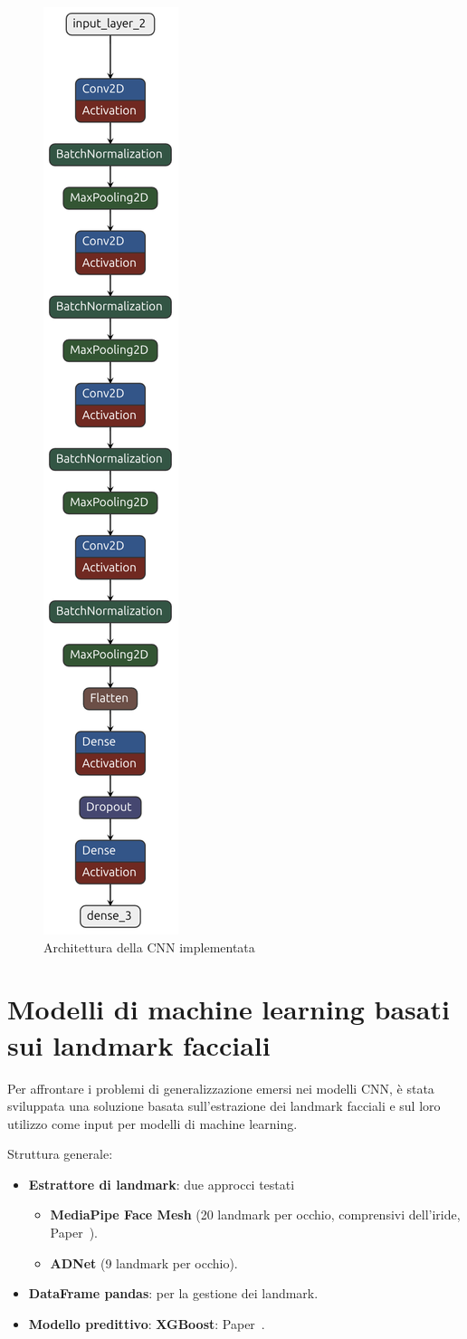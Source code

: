 \documentclass[12pt,a4paper,openright,twoside]{book}
\begin{document}
\begin{figure}
    \centering
    \includegraphics[width=.2\linewidth]{figures/custom-CNN-architecture}
    \caption{Architettura della CNN implementata}
    \label{fig:custom_CNN_architecture}
\end{figure}

\section{Modelli di machine learning basati sui landmark facciali}
\label{chap:landmark_based_model}

Per affrontare i problemi di generalizzazione emersi nei modelli CNN, è stata sviluppata una soluzione basata sull'estrazione dei landmark facciali e sul loro utilizzo come input per modelli di machine learning.  

Struttura generale:
\begin{itemize}
    \item \textbf{Estrattore di landmark}: due approcci testati
    \begin{itemize}
        \item \textbf{MediaPipe Face Mesh} (20 landmark per occhio, comprensivi dell'iride, Paper~\cite{48292}).
        \item \textbf{ADNet} (9 landmark per occhio).
    \end{itemize}
    \item \textbf{DataFrame pandas}: per la gestione dei landmark.
    \item \textbf{Modello predittivo}: \textbf{XGBoost}: Paper~\cite{xgboost}.
\end{itemize}
\end{document}
